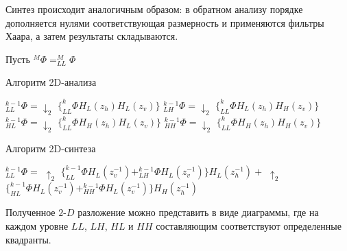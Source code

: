 \documentclass{article}
\begin{document}
Синтез происходит аналогичным образом: в обратном анализу порядке дополняется нулями соответствующая размерность и применяются фильтры Хаара, а затем результаты складываются.

Пусть $^{M}\Phi = _{LL}^{M}\Phi$
\begin{algorithm}[H]
\caption{Алгоритм 2D-анализа}
\begin{algorithmic}
		\State $_{LL}^{k-1}\Phi = \downarrow_{2}$ $\{_{LL}^{k}\Phi H_{L}(z_h)H_{L}(z_v)\}$
		\State $_{LH}^{k-1}\Phi = \downarrow_{2}$ $\{_{LL}^{k}\Phi H_{L}(z_h)H_{H}(z_v)\}$
		\State $_{HL}^{k-1}\Phi = \downarrow_{2}$ $\{_{LL}^{k}\Phi H_{H}(z_h)H_{L}(z_v)\}$
		\State $_{HH}^{k-1}\Phi = \downarrow_{2}$ $\{_{LL}^{k}\Phi H_{H}(z_h)H_{H}(z_v)\}$
	\EndFor
\end{algorithmic}
\end{algorithm}
\begin{algorithm}[H]
\caption{Алгоритм 2D-синтеза}
\begin{algorithmic}
	\State  $_{LL}^{k-1}\Phi=$ $\uparrow_2$  $\{_{LL}^{k-1}\Phi H_L(z_v^{-1}) + _{LH}^{k-1}\Phi H_L(z_v^{-1})\}H_L(z_h^{-1})+ $ $\uparrow_2$ $\{_{HL}^{k-1}\Phi H_L(z_v^{-1}) + _{HH}^{k-1}\Phi H_L(z_v^{-1})\}H_H(z_h^{-1})$
	\EndFor
\end{algorithmic}
\end{algorithm}	
Полученное $2$-$D$ разложение можно представить в виде диаграммы, где на каждом уровне $LL$, $LH$, $HL$ и $HH$ составляющим соответствуют определенные квадранты. 
\begin{center}
\end{center}
\end{document}
